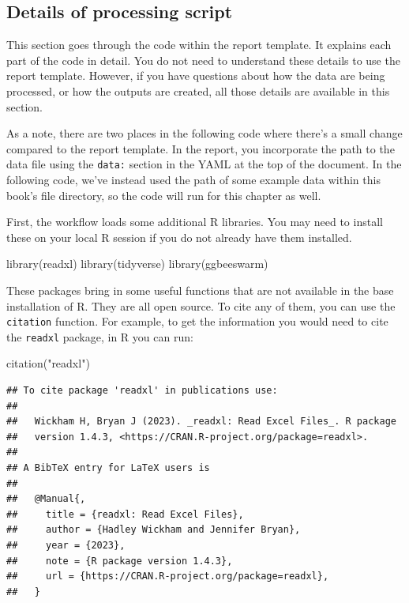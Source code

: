 \documentclass[
]{book}
\newenvironment{Shaded}{\begin{snugshade}}{\end{snugshade}}
\newcommand{\FunctionTok}[1]{\textcolor[rgb]{0.00,0.00,0.00}{#1}}
\newcommand{\NormalTok}[1]{#1}
\newcommand{\StringTok}[1]{\textcolor[rgb]{0.31,0.60,0.02}{#1}}
\begin{document}
\hypertarget{details-of-processing-script}{%
\subsection{Details of processing script}\label{details-of-processing-script}}

This section goes through the code within the report template. It
explains each part of the code in detail. You do not need to understand
these details to use the report template. However, if you have questions
about how the data are being processed, or how the outputs are created,
all those details are available in this section.

As a note, there are two places in the following code where there's a small
change compared to the report template. In the report, you incorporate the path
to the data file using the \texttt{data:} section in the YAML at the top of the
document. In the following code, we've instead used the path of some example
data within this book's file directory, so the code will run for this chapter as
well.

First, the workflow loads some additional R libraries. You may need to install
these on your local R session if you do not already have them installed.

\begin{Shaded}
\begin{Highlighting}[]
\FunctionTok{library}\NormalTok{(readxl)}
\FunctionTok{library}\NormalTok{(tidyverse)}
\FunctionTok{library}\NormalTok{(ggbeeswarm)}
\end{Highlighting}
\end{Shaded}

These packages bring in some useful functions that are not available in the
base installation of R. They are all open source. To cite any of them, you
can use the \texttt{citation} function. For example, to get the information you would
need to cite the \texttt{readxl} package, in R you can run:

\begin{Shaded}
\begin{Highlighting}[]
\FunctionTok{citation}\NormalTok{(}\StringTok{"readxl"}\NormalTok{)}
\end{Highlighting}
\end{Shaded}

\begin{verbatim}
## To cite package 'readxl' in publications use:
## 
##   Wickham H, Bryan J (2023). _readxl: Read Excel Files_. R package
##   version 1.4.3, <https://CRAN.R-project.org/package=readxl>.
## 
## A BibTeX entry for LaTeX users is
## 
##   @Manual{,
##     title = {readxl: Read Excel Files},
##     author = {Hadley Wickham and Jennifer Bryan},
##     year = {2023},
##     note = {R package version 1.4.3},
##     url = {https://CRAN.R-project.org/package=readxl},
##   }
\end{verbatim}
\end{document}

